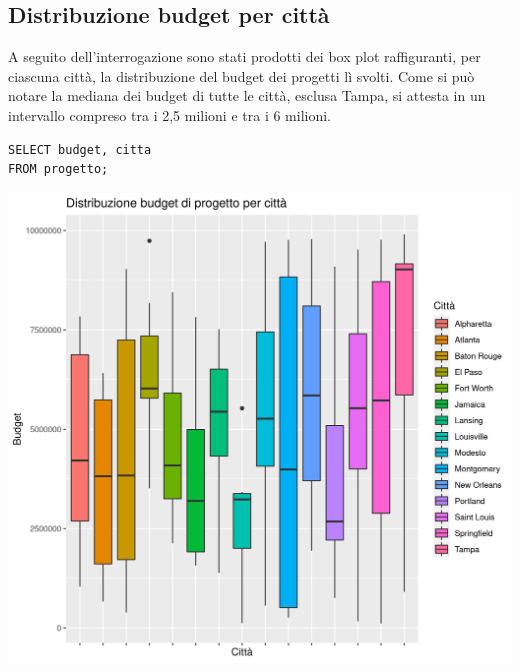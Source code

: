 \documentclass{article}
\begin{document}
\subsection{Distribuzione budget per città}
A seguito dell'interrogazione sono stati prodotti dei box plot raffiguranti, per ciascuna città, la distribuzione del budget dei progetti lì svolti.
\newline
Come si può notare la mediana dei budget di tutte le città, esclusa Tampa, si attesta in un intervallo compreso tra i 2,5 milioni e tra i 6 milioni.
\begin{verbatim}
SELECT budget, citta 
FROM progetto;
\end{verbatim}
\begin{center}
\includegraphics[width=\textwidth]{plot_dist_budget_progetto_citta.png}
\end{center}

\newpage
\end{document}
